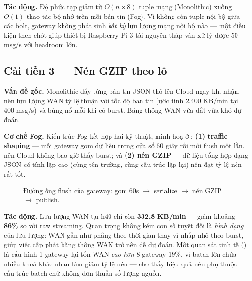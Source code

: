 \documentclass[13pt,a4paper]{report}
\begin{document}
\textbf{Tác động.} Độ phức tạp giảm từ $O(n \times 8)$ tuple mạng (Monolithic)
xuống $O(1)$ thao tác bộ nhớ trên mỗi bản tin (Fog). Vì không còn tuple nội bộ
giữa các bolt, gateway không phát sinh \textit{bất kỳ} lưu lượng mạng nội bộ nào
--- một điều kiện then chốt giúp thiết bị Raspberry Pi 3 tài nguyên thấp vẫn xử lý
được 50 msg/s với headroom lớn.

\subsection{Cải tiến 3 --- Nén GZIP theo lô}

\textbf{Vấn đề gốc.} Monolithic đẩy từng bản tin JSON thô lên Cloud ngay khi nhận,
nên lưu lượng WAN tỷ lệ thuận với tốc độ bản tin (ước tính 2.400 KB/min tại
400 msg/s) và bùng nổ mỗi khi có burst. Băng thông WAN vừa đắt vừa khó dự đoán.

\textbf{Cơ chế Fog.} Kiến trúc Fog kết hợp hai kỹ thuật, minh hoạ ở
: \textbf{(1) traffic shaping} --- mỗi gateway gom dữ liệu trong
cửa sổ 60 giây rồi mới flush một lần, nên Cloud không bao giờ thấy burst; và
\textbf{(2) nén GZIP} --- dữ liệu tổng hợp dạng JSON có tính lặp cao (cùng tên
trường, cùng cấu trúc lặp lại) nên đạt tỷ lệ nén rất tốt.

\begin{figure}[H]
\centering
{}
\caption{Đường ống flush của gateway: gom 60s $\to$ serialize $\to$ nén GZIP $\to$ publish.}
\label{fig:imp-gzip}
\end{figure}

\textbf{Tác động.} Lưu lượng WAN tại h40 chỉ còn \textbf{332,8 KB/min} --- giảm
khoảng \textbf{86\%} so với raw streaming. Quan trọng không kém con số tuyệt đối là
\textit{hình dạng} của lưu lượng: WAN gần như phẳng theo thời gian thay vì nhấp nhô
theo burst, giúp việc cấp phát băng thông WAN trở nên dễ dự đoán. Một quan sát tinh
tế () là cấu hình 1 gateway lại tốn WAN \textit{cao hơn} 8 gateway
19\%, vì batch lớn chứa nhiều khoá khác nhau làm giảm tỷ lệ nén --- cho thấy hiệu
quả nén phụ thuộc cấu trúc batch chứ không đơn thuần số lượng nguồn.
\end{document}
